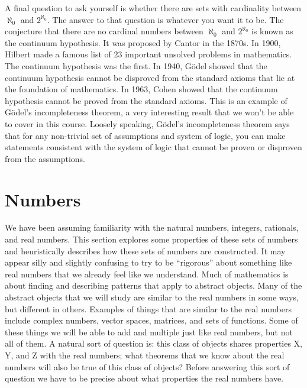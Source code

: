 \documentclass[12pt,reqno]{amsart}
\theoremstyle{definition}
\begin{document}
A final question to ask yourself is whether there are sets with
cardinality between $\aleph_0$ and $2^{\aleph_0}$. The answer to that
question is whatever you want it to be. The conjecture that there are
no cardinal numbers between $\aleph_0$ and $2^{\aleph_0}$ is known as
the continuum hypothesis. It was proposed by Cantor in the 1870s. In
1900, Hilbert made a famous list of 23 important unsolved problems in
mathematics. The continuum hypothesis was the first. In 1940,
G\"{o}del showed that the continuum hypothesis cannot be disproved
from the standard axioms that lie at the foundation of mathematics.
In 1963, Cohen showed that the continuum hypothesis cannot be proved
from the standard axioms. This is an example of G\"{o}del's
incompleteness theorem, a very interesting result that we won't be
able to cover in this course. Loosely speaking, G\"{o}del's
incompleteness theorem says that for any non-trivial set of
assumptions and system of logic, you can make statements consistent
with the system of logic that cannot be proven or disproven from the
assumptions.

\section{Numbers \label{s:numbers}}

We have been assuming familiarity with the natural numbers, integers,
rationals, and real numbers. This section explores some properties of
these sets of numbers and heuristically describes how these sets of
numbers are constructed. It may appear silly and slightly confusing to
try to be ``rigorous'' about something like real numbers that we
already feel like we understand.  Much of mathematics is about finding
and describing patterns that apply to abstract objects. Many of the
abstract objects that we will study are similar to the real numbers in
some ways, but different in others. Examples of things that are
similar to the real numbers include complex numbers, vector spaces,
matrices, and sets of functions. Some of these things we will be able
to add and multiple just like real numbers, but not all of them. A
natural sort of question is: this class of objects shares properties
X, Y, and Z with the real numbers; what theorems that we know about
the real numbers will also be true of this class of objects? Before
answering this sort of question we have to be precise about what
properties the real numbers have.
\end{document}
